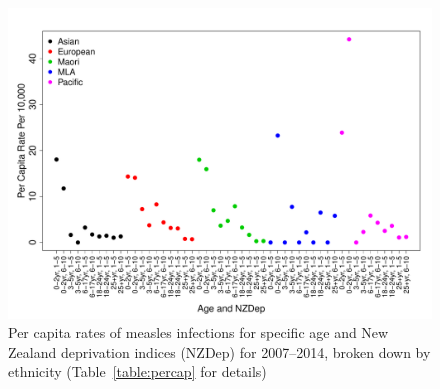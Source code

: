 \documentclass{article}
\begin{document}
\begin{itemize}
\begin{figure}
\begin{center}
\includegraphics{draftfinalreport-010}
\end{center}
\caption{Per capita rates of measles infections for specific age and New Zealand deprivation indices (NZDep) for 2007--2014, broken down by ethnicity (Table~\ref{table:percap} for details)}
\label{fig:percap}
\end{figure}


\end{itemize}
\end{document}

